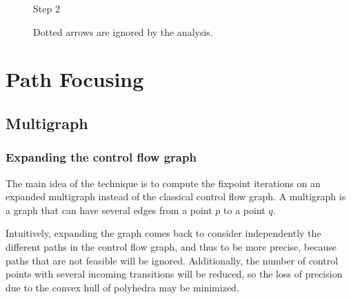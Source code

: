 \documentclass[a4paper,english,titlepage,11pt]{article}
\begin{document}
\begin{figure}[!h]
\begin{minipage}[c]{.46\linewidth}
\begin{tikzpicture}[->,>=stealth',auto,node distance=1.5cm,
                    semithick,font=\footnotesize]
\end{tikzpicture}
\centering Step 2
   \end{minipage}
   \caption{Dotted arrows are ignored by the analysis.}
\label{gopanreps}
\end{figure}
\FloatBarrier


 \section{Path Focusing}

	\subsection{Multigraph}

	\subsubsection{Expanding the control flow graph}
	The main idea of the technique is to compute the fixpoint iterations on an
	expanded multigraph instead of the classical control flow graph. A
	multigraph is a graph that can have several edges from a point $p$ to a
	point $q$. 

	Intuitively, expanding the graph comes back to consider independently the
	different paths in the control flow graph, and thus to be more precise,
	because paths that are not feasible will be ignored. Additionally, the
	number of control points with several incoming transitions will be reduced,
	so the loss of precision due to the convex hull of polyhedra may be
	minimized.
\end{document}
